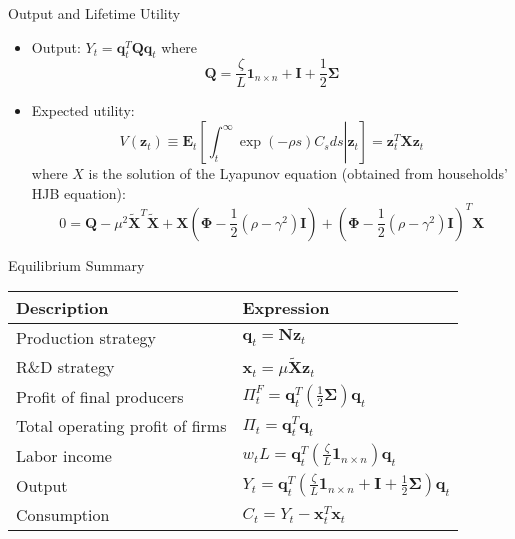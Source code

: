 \documentclass[
  10pt,               %
  aspectratio=169,     %
]{beamer}
\theoremstyle{plain}
\begin{document}
\begin{frame}{Output and Lifetime Utility }

  \label{X}
  \begin{itemize}
    \item Output: $Y_{t}=\bm{q}_{t}^{T}\bm{Q}\bm{q}_{t}$ where
          \[
            \bm{Q}=\frac{\zeta}{L}\bm{1}_{n\times n}+\bm{I}+\frac{1}{2}\bm{\Sigma}
          \]
    \item Expected utility:
          \[
            V\left(\bm{z}_{t}\right)\equiv\bm{E}_{t}\left[\left.\int_{t}^{\infty}\exp\left(-\rho s\right)C_{s}ds\right|\bm{z}_{t}\right]=\bm{z}_{t}^{T}\bm{X}\bm{z}_{t}
          \]
          where $X$ is the solution of the Lyapunov equation (obtained from
          households' HJB equation):
          \[
            0=\bm{Q}-\mu^{2}\bm{\tilde{X}}^{T}\bm{\tilde{X}}+\bm{X}\left(\bm{\Phi}-\frac{1}{2}\left(\rho-\gamma^{2}\right)\bm{I}\right)+\left(\bm{\Phi}-\frac{1}{2}\left(\rho-\gamma^{2}\right)\bm{I}\right)^{T}\bm{X}
          \]
  \end{itemize}
  \hyperlink{aggregation}{}
\end{frame}

\begin{frame}{Equilibrium Summary}
  \begin{center}
    \renewcommand{\arraystretch}{1.5}
    \begin{tabular}{ll}
      \toprule
      \textbf{Description}            & \textbf{Expression}                                                                                            \\
      \midrule
      Production strategy             & $\bm{q}_{t} = \bm{N}\bm{z}_{t}$                                                                                \\
      R\&D strategy                   & $\bm{x}_{t} = \mu\bm{\tilde{X}}\bm{z}_{t}$                                                                     \\
      Profit of final producers       & $\Pi_{t}^{F} = \bm{q}_{t}^{T}\left(\frac{1}{2}\bm{\Sigma}\right)\bm{q}_{t}$                                    \\
      Total operating profit of firms & $\Pi_{t} = \bm{q}_{t}^{T}\bm{q}_{t}$                                                                           \\
      Labor income                    & $w_{t}L = \bm{q}_{t}^{T}\left(\frac{\zeta}{L}\bm{1}_{n\times n}\right)\bm{q}_{t}$                              \\
      Output                          & $Y_{t} = \bm{q}_{t}^{T}\left(\frac{\zeta}{L}\bm{1}_{n\times n}+\bm{I}+\frac{1}{2}\bm{\Sigma}\right)\bm{q}_{t}$ \\
      Consumption                     & $C_{t} = Y_{t}-\bm{x}_{t}^{T}\bm{x}_{t}$                                                                       \\
      \bottomrule
    \end{tabular}
  \end{center}
  \hyperlink{aggregation}{}
\end{frame}
\end{document}
